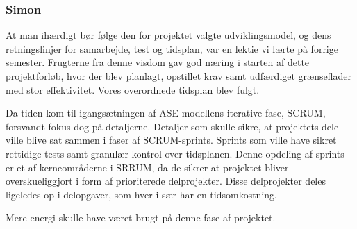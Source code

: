 \subsubsection{Simon}

At man ihærdigt bør følge den for projektet valgte udviklingsmodel, og dens retningslinjer for samarbejde, test og tidsplan, var en lektie vi lærte på forrige semester. Frugterne fra denne visdom gav god næring i starten af dette projektforløb, hvor der blev planlagt, opstillet krav samt udfærdiget grænseflader med stor effektivitet. Vores overordnede tidsplan blev fulgt. 

Da tiden kom til igangsætningen af ASE-modellens iterative fase, SCRUM, forsvandt fokus dog på detaljerne. Detaljer som skulle sikre, at projektets dele ville blive sat sammen i faser af SCRUM-sprints. Sprints som ville have sikret rettidige tests samt granulær kontrol over tidsplanen. 
Denne opdeling af sprints er et af kerneområderne i SRRUM, da de sikrer at projektet bliver overskueliggjort i form af prioriterede delprojekter. Disse delprojekter deles ligeledes op i delopgaver, som hver i sær har en tidsomkostning.

Mere energi skulle have været brugt på denne fase af projektet.